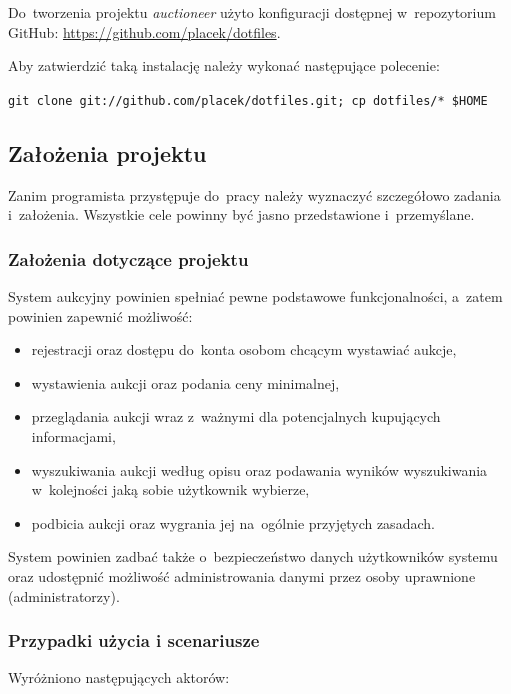 Do~tworzenia projektu \textit{auctioneer} użyto konfiguracji dostępnej w~repozytorium GitHub: \url{https://github.com/placek/dotfiles}.


Aby zatwierdzić taką instalację należy wykonać następujące polecenie:


\texttt{git clone git://github.com/placek/dotfiles.git; cp dotfiles/* \$HOME}

\subsection{Założenia projektu}

Zanim programista przystępuje do~pracy należy wyznaczyć szczegółowo zadania i~założenia. Wszystkie cele powinny być jasno przedstawione i~przemyślane.

\subsubsection{Założenia dotyczące projektu}

System aukcyjny powinien spełniać pewne podstawowe funkcjonalności, a~zatem powinien zapewnić możliwość:

\begin{itemize}
  \item rejestracji oraz dostępu do~konta osobom chcącym wystawiać aukcje,
  \item wystawienia aukcji oraz podania ceny minimalnej,
  \item przeglądania aukcji wraz z~ważnymi dla potencjalnych kupujących informacjami,
  \item wyszukiwania aukcji według opisu oraz podawania wyników wyszukiwania w~kolejności jaką sobie użytkownik wybierze,
  \item podbicia aukcji oraz wygrania jej na~ogólnie przyjętych zasadach.
\end{itemize}

System powinien zadbać także o~bezpieczeństwo danych użytkowników systemu oraz udostępnić możliwość administrowania danymi przez osoby uprawnione (administratorzy).

\subsubsection{Przypadki użycia i scenariusze}

Wyróżniono następujących aktorów:

